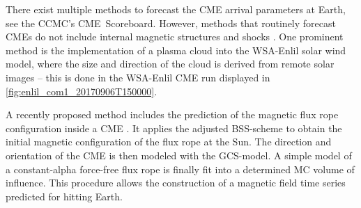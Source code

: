 There exist multiple methods to forecast the CME arrival parameters at Earth, see the CCMC's CME~Scoreboard. However, methods that routinely forecast CMEs do not include internal magnetic structures and shocks \citep{Savani2015}. One prominent method is the implementation of a plasma cloud into the WSA-Enlil solar wind model, where the size and direction of the cloud is derived from remote solar images \citep{Zheng2013} -- this is done in the WSA-Enlil CME run displayed in \autoref{fig:enlil_com1_20170906T150000}.

A recently proposed method includes the prediction of the magnetic flux rope configuration inside a CME \citep{Savani2015}. It applies the adjusted BSS-scheme to obtain the initial magnetic configuration of the flux rope at the Sun. The direction and orientation of the CME is then modeled with the GCS-model. A simple model of a constant-alpha force-free flux rope \citep{Burlaga1988} is finally fit into a determined MC volume of influence. This procedure allows the construction of a magnetic field time series predicted for hitting Earth.


